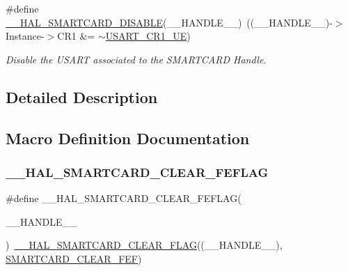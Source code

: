 \begin{DoxyCompactItemize}
\#define \hyperlink{group___s_m_a_r_t_c_a_r_d___exported___macros_gaeea5d27b1628195b28bb3f3fdf0b19bb}{\+\_\+\+\_\+\+H\+A\+L\+\_\+\+S\+M\+A\+R\+T\+C\+A\+R\+D\+\_\+\+D\+I\+S\+A\+B\+LE}(\+\_\+\+\_\+\+H\+A\+N\+D\+L\+E\+\_\+\+\_\+)~((\+\_\+\+\_\+\+H\+A\+N\+D\+L\+E\+\_\+\+\_\+)-\/$>$Instance-\/$>$C\+R1 \&=  $\sim$\hyperlink{group___peripheral___registers___bits___definition_ga2bb650676aaae4a5203f372d497d5947}{U\+S\+A\+R\+T\+\_\+\+C\+R1\+\_\+\+UE})
\begin{DoxyCompactList}\small\item\em Disable the U\+S\+A\+RT associated to the S\+M\+A\+R\+T\+C\+A\+RD Handle. \end{DoxyCompactList}\end{DoxyCompactItemize}


\subsection{Detailed Description}


\subsection{Macro Definition Documentation}
\mbox{\label{group___s_m_a_r_t_c_a_r_d___exported___macros_gac6c4cf3895f565304c68faf23139a533}} 
\subsubsection{\texorpdfstring{\+\_\+\+\_\+\+H\+A\+L\+\_\+\+S\+M\+A\+R\+T\+C\+A\+R\+D\+\_\+\+C\+L\+E\+A\+R\+\_\+\+F\+E\+F\+L\+AG}{\_\_HAL\_SMARTCARD\_CLEAR\_FEFLAG}}
{\footnotesize\ttfamily \#define \+\_\+\+\_\+\+H\+A\+L\+\_\+\+S\+M\+A\+R\+T\+C\+A\+R\+D\+\_\+\+C\+L\+E\+A\+R\+\_\+\+F\+E\+F\+L\+AG(\begin{DoxyParamCaption}\item[{}]{\+\_\+\+\_\+\+H\+A\+N\+D\+L\+E\+\_\+\+\_\+ }\end{DoxyParamCaption})~\hyperlink{group___s_m_a_r_t_c_a_r_d___exported___macros_gab40a9ea5252be0340f074b1cab9c2264}{\+\_\+\+\_\+\+H\+A\+L\+\_\+\+S\+M\+A\+R\+T\+C\+A\+R\+D\+\_\+\+C\+L\+E\+A\+R\+\_\+\+F\+L\+AG}((\+\_\+\+\_\+\+H\+A\+N\+D\+L\+E\+\_\+\+\_\+), \hyperlink{group___s_m_a_r_t_c_a_r_d___i_t___c_l_e_a_r___flags_ga3aa5dfa08809a2c1e8cb9f44d3132cc5}{S\+M\+A\+R\+T\+C\+A\+R\+D\+\_\+\+C\+L\+E\+A\+R\+\_\+\+F\+EF})}



